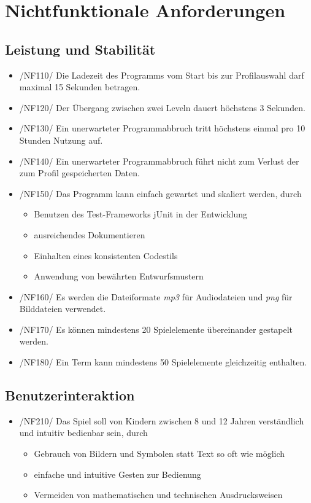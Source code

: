 \section{Nichtfunktionale Anforderungen}

\subsection{Leistung und Stabilität}

\begin{itemize}
\item /NF110/ Die Ladezeit des Programms vom Start bis zur Profilauswahl darf maximal 15 Sekunden betragen.
\item /NF120/ Der \"Ubergang zwischen zwei Leveln dauert höchstens 3 Sekunden.
\item /NF130/ Ein unerwarteter Programmabbruch tritt höchstens einmal pro 10 Stunden Nutzung auf.
\item /NF140/ Ein unerwarteter Programmabbruch führt nicht zum Verlust der zum Profil gespeicherten Daten.
\item /NF150/ Das Programm kann einfach gewartet und skaliert werden, durch
\begin{itemize}
\item Benutzen des Test-Frameworks jUnit in der Entwicklung
\item ausreichendes Dokumentieren
\item Einhalten eines konsistenten Codestils
\item Anwendung von bewährten Entwurfsmustern
\end{itemize}
\item /NF160/ Es werden die Dateiformate \textit{mp3} für Audiodateien und \textit{png} für Bilddateien verwendet.
\item /NF170/ Es können mindestens 20 Spielelemente übereinander gestapelt werden.
\item /NF180/ Ein Term kann mindestens 50 Spielelemente gleichzeitig enthalten.
\end{itemize}

\subsection{Benutzerinteraktion}
\begin{itemize}
\item /NF210/ Das Spiel soll von Kindern zwischen 8 und 12 Jahren verständlich und intuitiv bedienbar sein, durch
\begin{itemize}
\item Gebrauch von Bildern und Symbolen statt Text so oft wie möglich
\item einfache und intuitive Gesten zur Bedienung
\item Vermeiden von mathematischen und technischen Ausdrucksweisen
\end{itemize}
\end{itemize}

